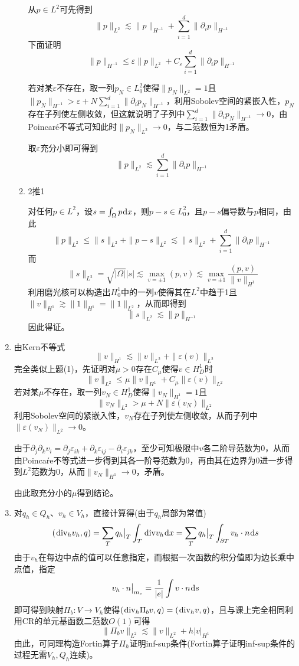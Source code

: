 \documentclass[a4paper,UTF8,fontset=windows,10pt]{ctexart}
\renewcommand{\div}{\hspace{0.09em}\mathrm{div}}
\newcommand*{\dr}{\hspace{0.07em}\mathrm{d}}
\begin{document}
\begin{enumerate}
\begin{enumerate}[(1)]
        从$p\in L^2$可先得到
        $$\|p\|_{L^2}\lesssim\|p\|_{H^{-1}}+\sum_{i=1}^d\|\partial_ip\|_{H^{-1}}$$
        下面证明
        $$\|p\|_{H^{-1}}\le\varepsilon\|p\|_{L^2}+C_\varepsilon\sum_{i=1}^d\|\partial_ip\|_{H^{-1}}$$

        若对某$\varepsilon$不存在，取一列$p_N\in L_0^2$使得$\|p_N\|_{L^2}=1$且$\|p_N\|_{H^{-1}}>\varepsilon+N\sum_{i=1}^d\|\partial_ip_N\|_{H^{-1}}$，利用Sobolev空间的紧嵌入性，$p_N$存在子列使左侧收敛，但这就说明了子列中$\sum_{i=1}^d\|\partial_ip_N\|_{H^{-1}}\to0$，由Poincar\'e不等式可知此时$\|p_N\|_{L^2}\to0$，与二范数恒为1矛盾。

        取$\varepsilon$充分小即可得到
        $$\|p\|_{L^2}\lesssim\sum_{i=1}^d\|\partial_ip\|_{H^{-1}}$$

        \item 2推1
        
        对任何$p\in L^2$，设$s=\int_\Omega p\dr x$，则$p-s\in L_0^2$，且$p-s$偏导数与$p$相同，由此
        $$\|p\|_{L^2}\le\|s\|_{L^2}+\|p-s\|_{L^2}\lesssim\|s\|_{L^2}+\sum_{i=1}^d\|\partial_ip\|_{H^{-1}}$$
        而
        $$\|s\|_{L^2}=\sqrt{|\Omega|}|s|\lesssim\max_{v=\pm1}(p,v)\lesssim\max_{v=\pm1}\frac{(p,v)}{\|v\|_{H^1}}$$
        利用磨光核可以构造出$H_0^1$中的一列$v$使得其在$L^2$中趋于1且$\|v\|_{H^1}\gtrsim\|1\|_{H^1}=\|1\|_{L^2}$，从而即得到
        $$\|s\|_{L^2}\lesssim\|p\|_{H^{-1}}$$
        因此得证。
    \end{enumerate}

    \item
    由Kern不等式
    $$\|v\|_{H^1}\lesssim\|v\|_{L^2}+\|\varepsilon(v)\|_{L^2}$$
    完全类似上题(1)，先证明对$\mu>0$存在$C_\mu$使得$v\in H_D^1$时
    $$\|v\|_{L^2}\le\mu\|v\|_{H^1}+C_\mu\|\varepsilon(v)\|_{L^2}$$
    若对某$\mu$不存在，取一列$v_N\in H_D^1$使得$\|v_N\|_{H^1}=1$且
    $$\|v_N\|_{L^2}>\mu+N\|\varepsilon(v_N)\|_{L^2}$$
    利用Sobolev空间的紧嵌入性，$v_N$存在子列使左侧收敛，从而子列中$\|\varepsilon(v_N)\|_{L^2}\to0$。

    由于$\partial_j\partial_kv_i=\partial_j\varepsilon_{ik}+\partial_k\varepsilon_{ij}-\partial_i\varepsilon_{jk}$，至少可知极限中$v$各二阶导范数为0，从而由Poinca\'re不等式进一步得到其各一阶导范数为0，再由其在边界为0进一步得到$L^2$范数为0，从而$\|v_N\|_{H^1}\to0$，矛盾。

    由此取充分小的$\mu$得到结论。

    \item
    对$q_h\in Q_h$、$v_h\in V_h$，直接计算得(由于$q_h$局部为常值)
    $$(\div_hv_h,q)=\sum_Tq_h\big|_T\int_T\div v_h\dr x=\sum_Tq_h\big|_T\int_{\partial T}v_h\cdot n\dr s$$
    由于$v_h$在每边中点的值可以任意指定，而根据一次函数的积分值即为边长乘中点值，指定
    $$v_h\cdot n\big|_{m_e}=\frac{1}{|e|}\int v\cdot n\dr s$$
    即可得到映射$\Pi_b:V\to V_h$使得$(\div_h\Pi_bv,q)=(\div_hv,q)$，且与课上完全相同利用CR的单元基函数二范数$O(1)$可得
    $$\|\Pi_bv\|_{L^2}\lesssim\|v\|_{L^2}+h|v|_{H^1}$$
    由此，可同理构造Fortin算子$\Pi_h$证明inf-sup条件(Fortin算子证明inf-sup条件的过程无需$V_h,Q_h$连续)。


\end{enumerate}
\end{document}
